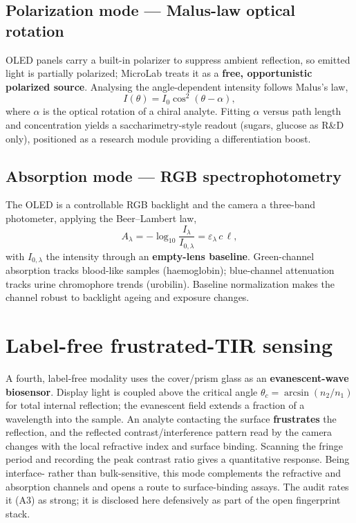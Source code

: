 \documentclass[11pt]{article}
\begin{document}
\subsection{Polarization mode --- Malus-law optical rotation}
OLED panels carry a built-in polarizer to suppress ambient reflection, so emitted light is
partially polarized; MicroLab treats it as a \textbf{free, opportunistic polarized source}.
Analysing the angle-dependent intensity follows Malus's law,
\begin{equation}
I(\theta) = I_0 \cos^2(\theta - \alpha),
\end{equation}
where $\alpha$ is the optical rotation of a chiral analyte. Fitting $\alpha$ versus path length
and concentration yields a saccharimetry-style readout (sugars, glucose as R\&D only),
positioned as a research module providing a differentiation boost.

\subsection{Absorption mode --- RGB spectrophotometry}
The OLED is a controllable RGB backlight and the camera a three-band photometer, applying the
Beer--Lambert law,
\begin{equation}
A_\lambda = -\log_{10}\!\frac{I_\lambda}{I_{0,\lambda}} = \varepsilon_\lambda\, c\, \ell ,
\end{equation}
with $I_{0,\lambda}$ the intensity through an \textbf{empty-lens baseline}. Green-channel
absorption tracks blood-like samples (haemoglobin); blue-channel attenuation tracks urine
chromophore trends (urobilin). Baseline normalization makes the channel robust to backlight
ageing and exposure changes.

\section{Label-free frustrated-TIR sensing}
A fourth, label-free modality uses the cover/prism glass as an \textbf{evanescent-wave
biosensor}. Display light is coupled above the critical angle $\theta_c=\arcsin(n_2/n_1)$ for
total internal reflection; the evanescent field extends a fraction of a wavelength into the
sample. An analyte contacting the surface \textbf{frustrates} the reflection, and the reflected
contrast/interference pattern read by the camera changes with the local refractive index and
surface binding. Scanning the fringe period and recording the peak contrast ratio gives a
quantitative response. Being interface- rather than bulk-sensitive, this mode complements the
refractive and absorption channels and opens a route to surface-binding assays. The audit rates
it (A3) as strong; it is disclosed here defensively as part of the open fingerprint stack.
\end{document}
